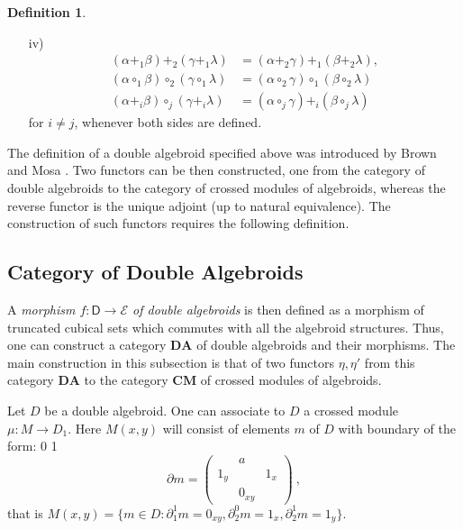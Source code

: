 \documentclass[12pt]{article}
\theoremstyle{plain}
\theoremstyle{definition}
\newtheorem{definition}{Definition}[section]
\numberwithin{equation}{section}
\newcommand{\D}{\mathcal D}
\newcommand{\E}{\mathcal E}
\renewcommand{\a}{\alpha}
\newcommand{\be}{\beta}
\newcommand{\del}{\partial}
\newcommand{\med}{\medbreak}
\newcommand{\lra}{{\longrightarrow}}
\newcommand{\<}{{\langle}}
\newcommand{\quadr}[4]
{\begin{pmatrix} & #1& \\[-1.1ex] #2 & & #3\\[-1.1ex]& #4&
 \end{pmatrix}}
\def\D{\mathsf{D}}
\begin{document}
\begin{definition}
\begin{itemize}
\med
\item[iv)]
\begin{equation}
\begin{aligned}
(\a  +_1 \be  ) +_2  (\gamma  +_1 \lambda )& = (\a  +_2 \gamma )
+_1 (\be   +_2  \lambda ) ,\\
 (\a  \circ _1 \be ) \circ _2  (\gamma  \circ _1  \lambda )& =
(\a  \circ _2  \gamma ) \circ _1  (\be   \circ _2  \lambda
 )\\ (\a  +_i \be  ) \circ _j (\gamma  +_i \lambda ) &= (\a  \circ _j
\gamma ) +_i (\be   \circ _j \lambda )
\end{aligned}
\end{equation}
for  $i \neq j$, whenever both sides are defined.
\end{itemize}

\end{definition}

The definition of a double algebroid specified above was introduced by Brown and Mosa \cite{RBM1986}. 
Two functors can be then constructed, one from the category of double algebroids to the
category of crossed modules of algebroids, whereas the reverse functor is the unique adjoint (up to natural
equivalence). The construction of such functors requires the following definition.

\subsection{Category of Double Algebroids}

A \textit{morphism $f : \D \to \E$ of double algebroids} is then
defined as a morphism of truncated cubical sets which commutes
with all the algebroid structures. Thus, one can construct a
category $\mathbf{DA}$ of double algebroids and their morphisms.
The main construction in this subsection is that of two functors
$\eta,\eta'$ from this category $\mathbf{DA}$ to the category
$\mathbf{CM}$ of crossed modules of algebroids.

Let ${D}$ be a double algebroid. One can associate to ${D}$ a
crossed module $\mu : M  \lra {D}_1$. Here $M(x,y)$ will consist
of elements $m$ of ${D}$ with boundary of the form:
                                                                                                0                         1
\begin{equation}
\del m = \quadr{a}{1_y}{1_x}{ 0_{xy}}~,
\end{equation}
that is
$M(x,y) = \{ m \in D : \del^1_1 m = 0_{xy} , \del^0_2 m =
1_x,\del^1_2  m = 1_y \}$.
\end{document}
